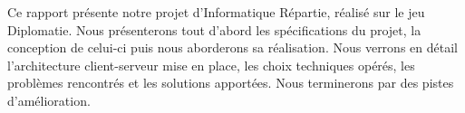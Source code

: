 Ce rapport présente notre projet d'Informatique Répartie, réalisé sur le jeu Diplomatie. Nous présenterons tout d'abord les spécifications du projet, la conception de celui-ci puis nous aborderons sa réalisation. Nous verrons en détail l'architecture client-serveur mise en place, les choix techniques opérés, les problèmes rencontrés et les solutions apportées. Nous terminerons par des pistes d'amélioration.
